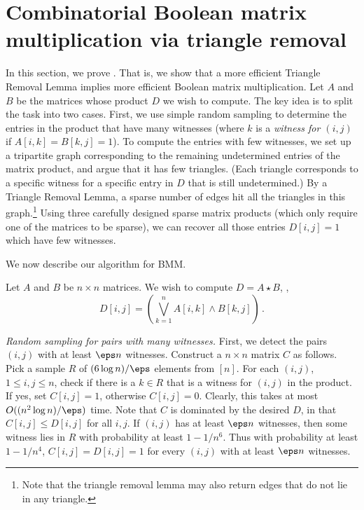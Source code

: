 \section{Combinatorial Boolean matrix multiplication via triangle removal}

In this section, we prove .
That is, we show that a more efficient Triangle Removal Lemma implies more efficient Boolean matrix multiplication.
Let $A$ and $B$ be the matrices whose product $D$ we wish to compute. The key idea is to split the task into two cases. First, we use simple random sampling to determine the entries in the product that have many witnesses (where $k$ is a \emph{witness for $(i,j)$} if $A[i,k]=B[k,j]=1$). To compute the entries with few witnesses, we set up a tripartite graph corresponding to the remaining undetermined entries of the matrix product, and argue that it has few triangles. (Each triangle corresponds to a specific witness for a specific entry in $D$ that is still undetermined.) By a Triangle Removal Lemma, a sparse number of edges hit all the triangles in this graph.\footnote{Note that the triangle removal lemma may also return edges that do not lie in any triangle.} Using three carefully designed sparse matrix products (which only require one of the matrices to be sparse), we can recover all those entries $D[i,j]=1$ which have few witnesses.

We now describe our algorithm for BMM.

\smallskip

 Let $A$ and $B$ be $n \times n$ matrices. We wish to compute $D = A \star B$, \ie,
\[
D[i,j] = \left(\bigvee_{k=1}^n A[i,k] \wedge B[k,j]\right)\,.
\] 

\smallskip

\noindent
\emph{Random sampling for pairs with many witnesses.}
First, we detect the pairs $(i,j)$ with at least $\eps n$ witnesses.
Construct a $n\times n$ matrix $C$  as follows. Pick a sample $R$ of $(6\log n)/\eps$ elements from $[n]$.
For each $(i,j)$,  $1 \leq i,j \leq n$, check if there is a $k \in R$ that is a witness for $(i,j)$ in the product. If yes, set $C[i,j]=1$, otherwise $C[i,j]=0$. Clearly, this takes at most $O((n^2 \log n) /\eps)$ time. Note that  $C$ is dominated by the desired $D$, in that $C[i,j] \leq D[i,j]$ for all $i,j$.
If $(i,j)$ has at least $\eps n$ witnesses, then some witness lies in $R$ with probability at least $1-1/n^6$. Thus with probability at least $1-1/n^4$, $C[i,j]=D[i,j]=1$ for every $(i,j)$ with at least $\eps n$ witnesses.

